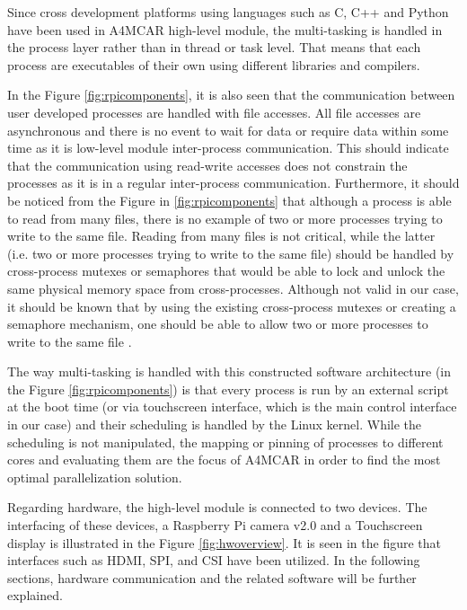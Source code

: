 Since cross development platforms using languages such as C, C++ and Python have been used in A4MCAR high-level module, the multi-tasking is handled in the process layer rather than in thread or task level. That means that each process are executables of their own using different libraries and compilers. 

In the Figure \ref{fig:rpicomponents}, it is also seen that the communication between user developed processes are handled with file accesses. All file accesses are asynchronous and there is no event to wait for data or require data within some time as it is low-level module inter-process communication. This should indicate that the communication using read-write accesses does not constrain the processes as it is in a regular inter-process communication. Furthermore, it should be noticed from the Figure in \ref{fig:rpicomponents} that although a process is able to read from many files, there is no example of two or more processes trying to write to the same file. Reading from many files is not critical, while the latter (i.e. two or more processes trying to write to the same file) should be handled by cross-process mutexes or semaphores that would be able to lock and unlock the same physical memory space from cross-processes. Although not valid in our case, it should be known that by using the existing cross-process mutexes or creating a semaphore mechanism, one should be able to allow two or more processes to write to the same file \cite{linuxkernelbook}.

The way multi-tasking is handled with this constructed software architecture (in the Figure \ref{fig:rpicomponents}) is that every process is run by an external script at the boot time (or via touchscreen interface, which is the main control interface in our case) and their scheduling is handled by the Linux kernel. While the scheduling is not manipulated, the mapping or pinning of processes to different cores and evaluating them are the focus of A4MCAR in order to find the most optimal parallelization solution.

Regarding hardware, the high-level module is connected to two devices. The interfacing of these devices, a Raspberry Pi camera v2.0 and a Touchscreen display is illustrated in the Figure \ref{fig:hwoverview}. It is seen in the figure that interfaces such as HDMI, SPI, and CSI have been utilized. In the following sections, hardware communication and the related software will be further explained.
